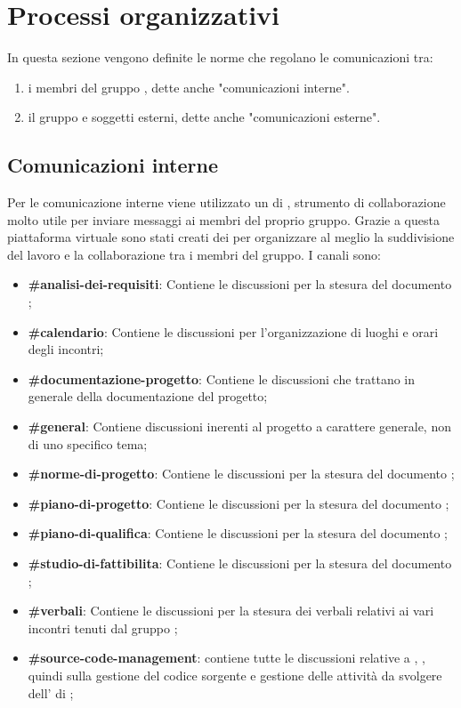 \section{Processi organizzativi}
In questa sezione vengono definite le norme che regolano le comunicazioni tra:
\begin{enumerate}
	\item i membri del gruppo \Gruppo{}, dette anche "comunicazioni interne".
	\item il gruppo e soggetti esterni, dette anche "comunicazioni esterne".
\end{enumerate}
	
\subsection{Comunicazioni interne}
Per le comunicazione interne viene utilizzato un  di , strumento di collaborazione molto utile per inviare messaggi ai membri del proprio gruppo.
Grazie a questa piattaforma virtuale sono stati creati dei  per organizzare al meglio la suddivisione del lavoro e la collaborazione tra i membri del gruppo.
I canali sono:
\begin{itemize}
	\item \textbf{\#analisi-dei-requisiti}: Contiene le discussioni per la stesura del documento \AdR{};
	\item \textbf{\#calendario}: Contiene le discussioni per l’organizzazione di luoghi e orari degli incontri;
	\item \textbf{\#documentazione-progetto}: Contiene le discussioni che trattano in generale della documentazione del progetto;
	\item \textbf{\#general}: Contiene discussioni inerenti al progetto a carattere generale, non di uno specifico tema;
	\item \textbf{\#norme-di-progetto}: Contiene le discussioni per la stesura del documento \NdP{};
    \item \textbf{\#piano-di-progetto}: Contiene le discussioni per la stesura del documento \PdP{};
	\item \textbf{\#piano-di-qualifica}: Contiene le discussioni per la stesura del documento \PdQ{};
	\item \textbf{\#studio-di-fattibilita}: Contiene le discussioni per la stesura del documento \SdF{};
	\item \textbf{\#verbali}: Contiene le discussioni per la stesura dei verbali relativi ai vari incontri tenuti dal gruppo \Gruppo{};
	\item \textbf{\#source-code-management}: contiene tutte le discussioni relative a , , quindi sulla gestione del codice sorgente e gestione delle attività da svolgere dell' di ;
\end{itemize}

